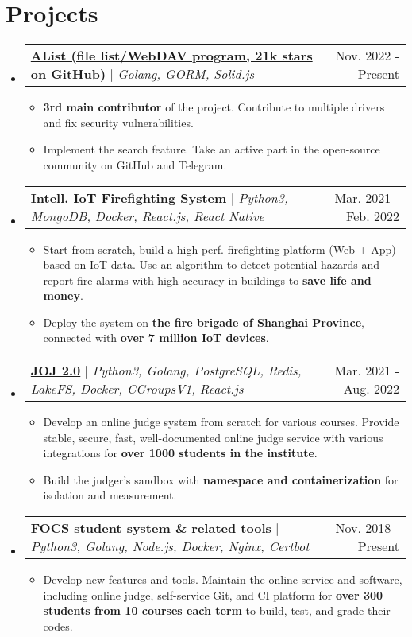 \documentclass[letterpaper,11pt]{article}
\makeatletter
\newcommand{\resumeItem}[1]{
  \item\small{
    {#1 \vspace{-2pt}}
  }
}
\newcommand{\resumeProjectHeader}[2]{
    \item
    \begin{tabular*}{0.98\textwidth}{l@{\extracolsep{\fill}}r}
      \small#1 & #2 \\
    \end{tabular*}\vspace{-7pt}
}
\newcommand{\resumeSubHeaderListStart}{\begin{itemize}[leftmargin=0.15in, label={}]}
\newcommand{\resumeSubHeaderListEnd}{\end{itemize}}
\newcommand{\resumeItemListStart}{\begin{itemize}}
\newcommand{\resumeItemListEnd}{\end{itemize}\vspace{-5pt}}
\makeatother
\begin{document}
\section{Projects}
    \resumeSubHeaderListStart
      \resumeProjectHeader
        {\href{https://github.com/alist-org/alist}{\textbf{AList (file list/WebDAV program, 21k stars on GitHub)}} $|$ \emph{Golang, GORM, Solid.js}}{Nov. 2022 - Present}
        \resumeItemListStart
          \resumeItem{\textbf{3rd main contributor} of the project. Contribute to multiple drivers and fix security vulnerabilities.}
          \resumeItem{Implement the search feature. Take an active part in the open-source community on GitHub and Telegram.}
        \resumeItemListEnd
      \resumeProjectHeader
        {\href{https://github.com/SJTU-IPP-Firefighting}{\textbf{Intell. IoT Firefighting System}} $|$ \emph{Python3, MongoDB, Docker, React.js, React Native}}{Mar. 2021 - Feb. 2022}
        \resumeItemListStart
          \resumeItem{Start from scratch, build a high perf. firefighting platform (Web + App) based on IoT data. Use an algorithm to detect potential hazards and report fire alarms with high accuracy in buildings to \textbf{save life and money}.}
          \resumeItem{Deploy the system on \textbf{the fire brigade of Shanghai Province}, connected with \textbf{over 7 million IoT devices}.}
        \resumeItemListEnd
      \resumeProjectHeader
        {\href{https://github.com/joint-online-judge}{\textbf{JOJ 2.0}} $|$ \emph{Python3, Golang, PostgreSQL, Redis, LakeFS, Docker, CGroupsV1, React.js}}{Mar. 2021 - Aug. 2022}
        \resumeItemListStart
          \resumeItem{Develop an online judge system from scratch for various courses. Provide stable, secure, fast, well-documented online judge service with various integrations for \textbf{over 1000 students in the institute}.}
          \resumeItem{Build the judger's sandbox with \textbf{namespace and containerization} for isolation and measurement.}
        \resumeItemListEnd
      \resumeProjectHeader
        {\href{https://gist.github.com/BoYanZh/fc4469c20fd6adf42c212114532aaac0}{\textbf{FOCS student system \& related tools}} $|$ \emph{Python3, Golang, Node.js, Docker, Nginx, Certbot}}{Nov. 2018 - Present}
        \resumeItemListStart
          \resumeItem{Develop new features and tools. Maintain the online service and software, including online judge, self-service Git, and CI platform for \textbf{over 300 students from 10 courses each term} to build, test, and grade their codes.}
        \resumeItemListEnd
    \resumeSubHeaderListEnd



\end{document}
